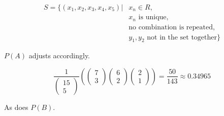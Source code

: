 \documentclass[10pt]{article}
\begin{document}
\begin{easylist}[enumerate]
    \[
        \begin{aligned}
             S = \{ (x_1, x_2, x_3, x_4, x_5) | & x_n \in R,\\
                                                     & x_n \text{ is unique},\\
                                                     & \text{no combination is repeated},\\
                                                     & y_1, y_2 \text{ not in the set together} \}
        \end{aligned}
    \]

    $P(A)$ adjusts accordingly.

    \[
        \frac{1}{\begin{pmatrix}15\\5\end{pmatrix}}
        \left(
            \begin{pmatrix}7\\3\end{pmatrix} \begin{pmatrix}6\\2\end{pmatrix} \begin{pmatrix}2\\1\end{pmatrix}
        \right) = \boxed{\frac{50}{143} \approx 0.34965}
    \]

    As does $P(B)$.


\end{easylist}
\end{document}
